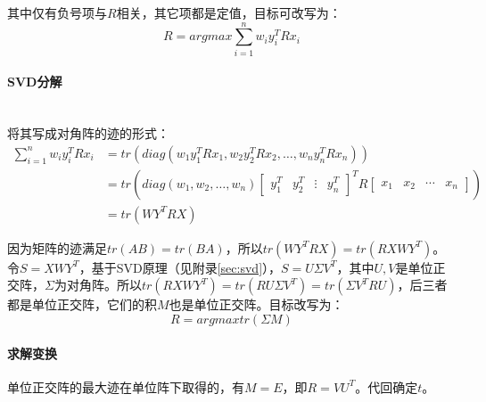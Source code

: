 \documentclass[
12pt, %
a4paper, 
oneside, %
headinclude,footinclude, %
]{scrartcl}
\begin{document}
其中仅有负号项与$ R $相关，其它项都是定值，目标可改写为：
$$ R = argmax \sum_{i = 1}^{n}w_i y_i^T R x_i $$
\paragraph{SVD分解}\label{sec:svd back}~\\

将其写成对角阵的迹的形式：
\begin{align*}
\sum_{i = 1}^{n} w_i y_i^T R x_i 
&= tr(diag(w_1 y_1^T R x_1, w_2 y_2^T R x_2, \dots, w_n y_n^T R x_n)) \\
&= tr(diag(w_1, w_2, \dots, w_n) \begin{bmatrix} y_1^T & y_2^T & \vdots & y_n^T \end{bmatrix}^T R \begin{bmatrix} x_1 & x_2 & \cdots & x_n \end{bmatrix}) \\
&= tr(W Y^T R X)
\end{align*}

因为矩阵的迹满足$ tr(AB) = tr(BA) $，所以$ tr(W Y^T R X) = tr(R X W Y^T) $。令$ S = X W Y^T $，基于SVD原理（见附录\ref{sec:svd}），$ S = U \Sigma V^T $，其中$ U, V $是单位正交阵，$ \Sigma $为对角阵。所以$ tr(R X W Y^T) = tr(R U \Sigma V^T) = tr(\Sigma V^T R U) $，后三者都是单位正交阵，它们的积$ M $也是单位正交阵。目标改写为：
$$ R = argmax tr(\Sigma M) $$
\paragraph{求解变换}
单位正交阵的最大迹在单位阵下取得的，有$ M = E $，即$ R = V U^T $。代回确定$ t $。
\end{document}
